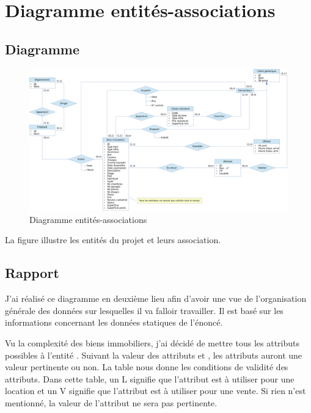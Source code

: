 \chapter{Diagramme entités-associations}

\section{Diagramme}

\begin{figure}
  \centering
  \includegraphics[angle=90,height=0.99\textheight]{IMG/er}
  \caption{Diagramme entités-associations}
  \label{img_er}
\end{figure}

La figure  illustre les entités du projet et leurs association.

\section{Rapport}

J'ai réalisé ce diagramme en deuxième lieu afin d'avoir une vue de l'organisation générale des données sur lesquelles il va falloir travailler. Il est basé sur les informations concernant les données statiques de l'énoncé.

Vu la complexité des biens immobiliers, j'ai décidé de mettre tous les attributs possibles à l'entité . Suivant la valeur des attributs  et , les attributs auront une valeur pertinente ou non. La table  nous donne les conditions de validité des attributs. Dans cette table, un \og{}L\fg{} signifie que l'attribut est à utiliser pour une location et un \og{}V\fg{} signifie que l'attribut est à utiliser pour une vente. Si rien n'est mentionné, la valeur de l'attribut ne sera pas pertinente.

